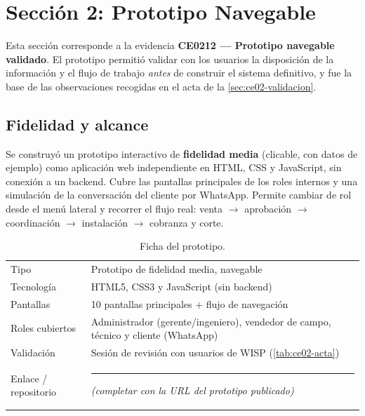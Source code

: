 \section{Sección 2: Prototipo Navegable}
\label{chap:ce02-prototipo}

Esta sección corresponde a la evidencia \textbf{CE0212 — Prototipo navegable
validado}. El prototipo permitió validar con los usuarios la disposición de la
información y el flujo de trabajo \emph{antes} de construir el sistema definitivo, y
fue la base de las observaciones recogidas en el acta de la
\cref{sec:ce02-validacion}.

\subsection{Fidelidad y alcance}

Se construyó un prototipo interactivo de \textbf{fidelidad media} (clicable, con datos
de ejemplo) como aplicación web independiente en HTML, CSS y JavaScript, sin conexión
a un backend. Cubre las pantallas principales de los roles internos y una simulación
de la conversación del cliente por WhatsApp. Permite cambiar de rol desde el menú
lateral y recorrer el flujo real: venta $\rightarrow$ aprobación $\rightarrow$
coordinación $\rightarrow$ instalación $\rightarrow$ cobranza y corte.

\begin{table}[htbp]
\centering
\caption{Ficha del prototipo.}
\label{tab:ce02-ficha-proto}
\small
\begin{tabularx}{\textwidth}{L{3.5cm}X}
\toprule
Tipo & Prototipo de fidelidad media, navegable \\
Tecnología & HTML5, CSS3 y JavaScript (sin backend) \\
Pantallas & 10 pantallas principales + flujo de navegación \\
Roles cubiertos & Administrador (gerente/ingeniero), vendedor de campo, técnico y cliente (WhatsApp) \\
Validación & Sesión de revisión con usuarios de WISP (\cref{tab:ce02-acta}) \\
Enlace / repositorio & \rule{7cm}{0.4pt} \emph{(completar con la URL del prototipo publicado)} \\
\bottomrule
\end{tabularx}
\end{table}


